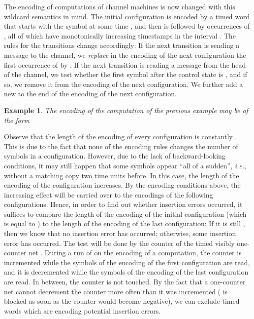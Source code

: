\documentclass{CSML}
\theoremstyle{plain}\newtheorem{theorem}[thm]{Theorem}
\theoremstyle{plain}\newtheorem{corollary}[thm]{Corollary}
\theoremstyle{plain}\newtheorem{example}[thm]{Example}
\theoremstyle{plain}\newtheorem{lemma}[thm]{Lemma}
\theoremstyle{plain}\newtheorem{remark}[thm]{Remark}
\newcommand*\ie{\textit{i.e.}}
\begin{document}
The encoding of computations of channel machines is now changed with this wildcard semantics in mind. 
The initial configuration is encoded by a timed word that starts with the symbol  at some time , and then is followed by  occurrences of , all of which have monotonically increasing timestamps in the interval . 
The rules for the transitions change accordingly:
If the next transition is sending a message  to the channel, we \emph{replace} in the encoding of the next configuration the first occurrence of  by . 
If the next transition is reading a message  from the head of the channel, we test whether the first symbol after the control state is , and if so, we remove it from the encoding of the next configuration. We further add a new  to the end of the encoding of the next configuration.\begin{example}
	The encoding of the computation of the previous example may be of the form
	
	
\end{example}
Observe that the length of the encoding of every configuration is constantly . This is due to the fact that none of the encoding rules changes the number of symbols in a configuration. 
However, due to the lack of backward-looking conditions, 
it may still happen that some symbols appear ``all of a sudden'', \ie, without a matching copy two time units before. 
In this case, the length of the encoding of the configuration increases. By the encoding conditions above, the increasing effect will be carried over to the encodings of the following configurations. 
Hence, in order to find out whether insertion errors occurred, 
it suffices to compare the length of the encoding of the initial configuration (which is equal to ) to the length of the encoding of the last configuration: If it is still , then we know that no insertion error has occurred; otherwise, some insertion error has occurred. 
The test will be done by the counter of the timed visibly one-counter net . 
During a run of  on the encoding of a computation, 
the counter is incremented while the symbols of the encoding of the first configuration are read, and it is decremented while the symbols of the encoding of the last configuration are read. In between, the counter is not touched. By the fact that a one-counter net cannot decrement the counter more often than it was incremented ( is blocked as soon as the counter would become negative), we can exclude timed words which are encoding potential insertion errors. 
\end{document}
